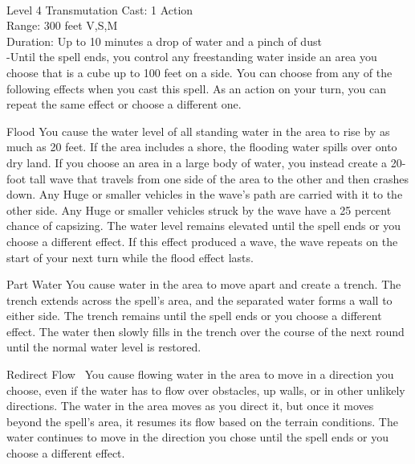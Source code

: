 \documentclass[10pt,twocolumn]{report}
\begin{document}
 \\
Level 4 \quad Transmutation \quad Cast: 1 Action\\
Range: 300 feet \quad V,S,M \\
Duration: Up to 10 minutes \quad a drop of water and a pinch of dust\\
-Until the spell ends, you control any freestanding water inside an area you choose that is a cube up to 100 feet on a side. 
You can choose from any of the following effects when you cast this spell. As an action on your turn, you can repeat the same effect or choose a different one. 

Flood 
You cause the water level of all standing water in the area to rise by as much as 20 feet. If the area includes a shore, the flooding water spills over onto dry land. If you choose an area in a large body of water, you instead create a 20-foot tall wave that travels from one side of the area to the other and then crashes down. Any Huge or smaller vehicles in the wave’s path are carried with it to the other side. Any Huge or smaller vehicles struck by the wave have a 25 percent chance of capsizing. The water level remains elevated until the spell ends or you choose a different effect. If this effect produced a wave, the wave repeats on the start of your next turn while the flood effect lasts. 

Part Water 
You cause water in the area to move apart and create a trench. The trench extends across the spell’s area, and the separated water forms a wall to either side. The trench remains until the spell ends or you choose a different effect. The water then slowly fills in the trench over the course of the next round until the normal water level is restored. 

Redirect Flow 
You cause flowing water in the area to move in a direction you choose, even if the water has to flow over obstacles, up walls, or in other unlikely directions. The water in the area moves as you direct it, but once it moves beyond the spell’s area, it resumes its flow based on the terrain conditions. The water continues to move in the direction you chose until the spell ends or you choose a different effect. 
\end{document}
